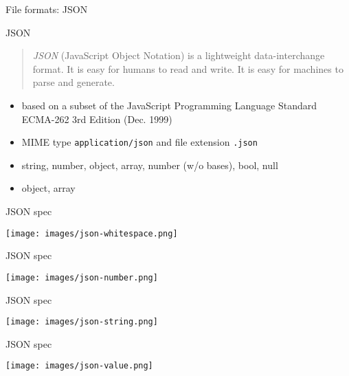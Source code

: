 \documentclass{beamer}
\begin{document}
\begin{frame}[standout]
  File formats: JSON
\end{frame}

\begin{frame}[fragile]{JSON}
  \begin{quote}
    \emph{JSON} (JavaScript Object Notation) is a lightweight data-interchange format. It is easy for humans to read and write. It is easy for machines to parse and generate.
  \end{quote}

  \begin{itemize}
    \item based on a subset of the JavaScript Programming Language Standard ECMA-262 3rd Edition (Dec. 1999)
    \item MIME type \texttt{application/json} and file extension \texttt{.json}
    \item string, number, object, array, number (w/o bases), bool, null
    \item object, array
  \end{itemize}
\end{frame}

\begin{frame}[fragile]{JSON spec}
  \begin{center}
    \texttt{[image: images/json-whitespace.png]}
  \end{center}
\end{frame}

\begin{frame}[fragile]{JSON spec}
  \begin{center}
    \texttt{[image: images/json-number.png]}
  \end{center}
\end{frame}

\begin{frame}[fragile]{JSON spec}
  \begin{center}
    \texttt{[image: images/json-string.png]}
  \end{center}
\end{frame}

\begin{frame}[fragile]{JSON spec}
  \begin{center}
    \texttt{[image: images/json-value.png]}
  \end{center}
\end{frame}
\end{document}

